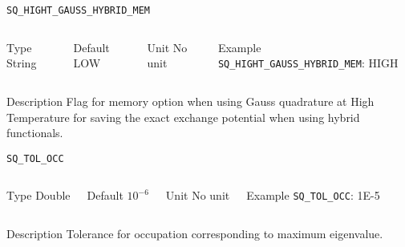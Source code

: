\begin{frame}[allowframebreaks]{\texttt{SQ\_HIGHT\_GAUSS\_HYBRID\_MEM}} \label{SQ_HIGHT_GAUSS_HYBRID_MEM}
\vspace*{-12pt}
\begin{columns}
\begin{block}{Type}
String
\end{block}

\begin{block}{Default}
LOW
\end{block}

\begin{block}{Unit}
No unit
\end{block}

\begin{block}{Example}
\texttt{SQ\_HIGHT\_GAUSS\_HYBRID\_MEM}: HIGH
\end{block}
\end{columns}

\begin{block}{Description}
Flag for memory option when using Gauss quadrature at High Temperature for saving the exact exchange potential when using hybrid functionals. 
\end{block}

\end{frame}


\begin{frame}[allowframebreaks]{\texttt{SQ\_TOL\_OCC}} \label{SQ_TOL_OCC}
\vspace*{-12pt}
\begin{columns}
\begin{block}{Type}
Double
\end{block}

\begin{block}{Default}
$10^{-6}$
\end{block}

\begin{block}{Unit}
No unit
\end{block}

\begin{block}{Example}
\texttt{SQ\_TOL\_OCC}: 1E-5
\end{block}
\end{columns}

\begin{block}{Description}
Tolerance for occupation corresponding to maximum eigenvalue.
\end{block}

\end{frame}


